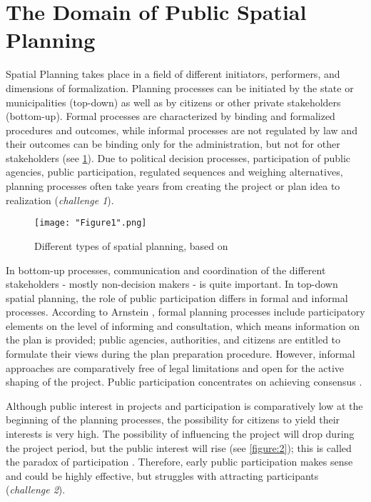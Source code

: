 \documentclass[conference]{IEEEtran}
\begin{document}
\section{The Domain of Public Spatial Planning}
\label{ch:2}
Spatial Planning takes place in a field of different initiators, performers, 
and dimensions of formalization. Planning processes can be initiated by the 
state or municipalities (top-down) as well as by citizens or other private 
stakeholders (bottom-up). Formal processes are characterized by binding and 
formalized procedures and outcomes, while informal processes are not regulated 
by law and their outcomes can be binding only for the administration, but not 
for other stakeholders (see \figurename{ \ref{figure:1}}). Due to political 
decision processes, participation of public agencies, public participation, 
regulated sequences and weighing alternatives, planning processes often take 
years from creating the project or plan idea to realization 
(\textit{challenge 1}).

\begin{figure}[!b]
	\centering
	\texttt{[image: "Figure1".png]}\hfill
	\caption{Different types of spatial planning, based on \cite{Horelli.2016}}
	\label{figure:1}
\end{figure}

In bottom-up processes, communication and coordination of the different 
stakeholders - mostly non-decision makers - is quite important. In top-down 
spatial planning, the role of public participation differs in formal and 
informal processes. According to Arnstein \cite{Arnstein.1969}, formal planning 
processes include participatory elements on the level of informing and 
consultation, which means information on the plan is provided; public 
agencies, authorities, and citizens are entitled to formulate their views 
during the plan preparation procedure. However, informal approaches are 
comparatively free of legal limitations and open for the active shaping of the 
project. Public participation concentrates on achieving consensus 
\cite{Pahl.2008}.

Although public interest in projects and participation is comparatively low at 
the beginning of the planning processes, the possibility for citizens to yield 
their interests is very high. The possibility of influencing the project will 
drop during the project period, but the public interest will rise (see 
\figurename{ \ref{figure:2}}); this is called the paradox of participation 
\cite{Reinert.1997}. Therefore, early public participation makes sense and 
could be highly effective, but struggles with attracting participants 
(\textit{challenge 2}).
\end{document}
